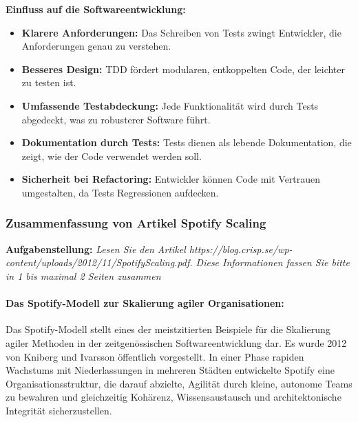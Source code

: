 \textbf{Einfluss auf die Softwareentwicklung:}
\begin{itemize}
    \item \textbf{Klarere Anforderungen:} Das Schreiben von Tests zwingt Entwickler, die Anforderungen genau zu verstehen.
    \item \textbf{Besseres Design:} TDD fördert modularen, entkoppelten Code, der leichter zu testen ist.
    \item \textbf{Umfassende Testabdeckung:} Jede Funktionalität wird durch Tests abgedeckt, was zu robusterer Software führt.
    \item \textbf{Dokumentation durch Tests:} Tests dienen als lebende Dokumentation, die zeigt, wie der Code verwendet werden soll.
    \item \textbf{Sicherheit bei Refactoring:} Entwickler können Code mit Vertrauen umgestalten, da Tests Regressionen aufdecken.
\end{itemize}





\subsubsection{Zusammenfassung von Artikel Spotify Scaling}
\textbf{Aufgabenstellung:} \textit{Lesen Sie den Artikel https://blog.crisp.se/wp-content/uploads/2012/11/SpotifyScaling.pdf.
Diese Informationen fassen Sie bitte in 1 bis maximal 2 Seiten zusammen}

\paragraph{Das Spotify-Modell zur Skalierung agiler Organisationen:}Das Spotify-Modell stellt eines der meistzitierten Beispiele für die Skalierung agiler Methoden in der zeitgenössischen Softwareentwicklung dar. 
Es wurde 2012 von Kniberg und Ivarsson öffentlich vorgestellt. In einer Phase rapiden Wachstums mit Niederlassungen in mehreren Städten entwickelte Spotify eine Organisationsstruktur, die darauf abzielte, 
Agilität durch kleine, autonome Teams zu bewahren und gleichzeitig Kohärenz, Wissensaustausch und architektonische Integrität sicherzustellen.
